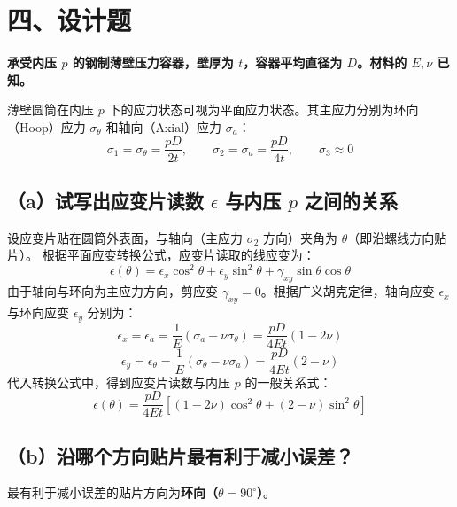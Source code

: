 \documentclass[11pt,a4paper]{ctexrep}
\begin{document}
{\section*{四、设计题}

\textbf{承受内压 $p$ 的钢制薄壁压力容器，壁厚为 $t$，容器平均直径为 $D$。材料的 $E, \nu$ 已知。}

薄壁圆筒在内压 $p$ 下的应力状态可视为平面应力状态。其主应力分别为环向（Hoop）应力 $\sigma_\theta$ 和轴向（Axial）应力 $\sigma_a$：
\[
    \sigma_1 = \sigma_\theta = \frac{pD}{2t}, \qquad \sigma_2 = \sigma_a = \frac{pD}{4t}, \qquad \sigma_3 \approx 0
\]

\subsection*{（a）试写出应变片读数 $\epsilon$ 与内压 $p$ 之间的关系}

设应变片贴在圆筒外表面，与轴向（主应力 $\sigma_2$ 方向）夹角为 $\theta$（即沿螺线方向贴片）。
根据平面应变转换公式，应变片读取的线应变为：
\[
    \epsilon(\theta) = \epsilon_x \cos^2\theta + \epsilon_y \sin^2\theta + \gamma_{xy} \sin\theta \cos\theta
\]
由于轴向与环向为主应力方向，剪应变 $\gamma_{xy} = 0$。根据广义胡克定律，轴向应变 $\epsilon_x$ 与环向应变 $\epsilon_y$ 分别为：
\[
    \epsilon_x = \epsilon_a = \frac{1}{E} (\sigma_a - \nu \sigma_\theta) = \frac{pD}{4Et} (1 - 2\nu)
\]
\[
    \epsilon_y = \epsilon_\theta = \frac{1}{E} (\sigma_\theta - \nu \sigma_a) = \frac{pD}{4Et} (2 - \nu)
\]
代入转换公式中，得到应变片读数与内压 $p$ 的一般关系式：
\[
    \epsilon(\theta) = \frac{pD}{4Et} \left[ (1 - 2\nu) \cos^2\theta + (2 - \nu) \sin^2\theta \right]
\]

\subsection*{（b）沿哪个方向贴片最有利于减小误差？}

最有利于减小误差的贴片方向为\textbf{环向（$\theta = 90^\circ$）}。

}
\end{document}
